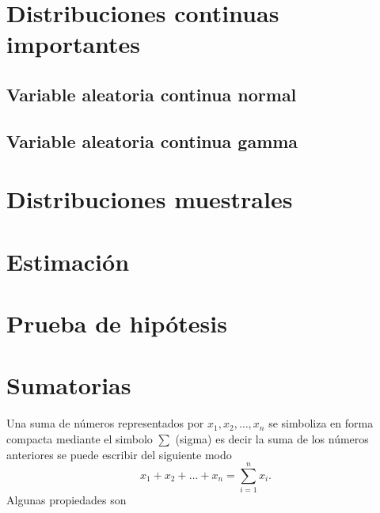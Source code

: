 \documentclass[
  10pt,
]{krantz}
\theoremstyle{definition}
\theoremstyle{definition}
\theoremstyle{definition}
\theoremstyle{definition}
\theoremstyle{remark}
\begin{document}
\hypertarget{distribuciones-continuas-importantes}{%
\chapter{Distribuciones continuas importantes}\label{distribuciones-continuas-importantes}}

\hypertarget{variable-aleatoria-continua-normal}{%
\section{Variable aleatoria continua normal}\label{variable-aleatoria-continua-normal}}

\hypertarget{variable-aleatoria-continua-gamma}{%
\section{Variable aleatoria continua gamma}\label{variable-aleatoria-continua-gamma}}

\hypertarget{distribuciones-muestrales}{%
\chapter{Distribuciones muestrales}\label{distribuciones-muestrales}}

\hypertarget{estimaciuxf3n}{%
\chapter{Estimación}\label{estimaciuxf3n}}

\hypertarget{prueba-de-hipuxf3tesis}{%
\chapter{Prueba de hipótesis}\label{prueba-de-hipuxf3tesis}}

\hypertarget{appendix-apendice}{%
\appendix {}}


\hypertarget{sumatorias}{%
\chapter{Sumatorias}\label{sumatorias}}

Una suma de números representados por \(x_1, x_2, \ldots, x_n\) se simboliza en forma compacta mediante el simbolo \(\sum\) (sigma) es decir la suma de los números anteriores se puede escribir del siguiente modo \[x_1+x_2+\dots+x_n=\sum_{i=1}^nx_i.\]
Algunas propiedades son
\end{document}
